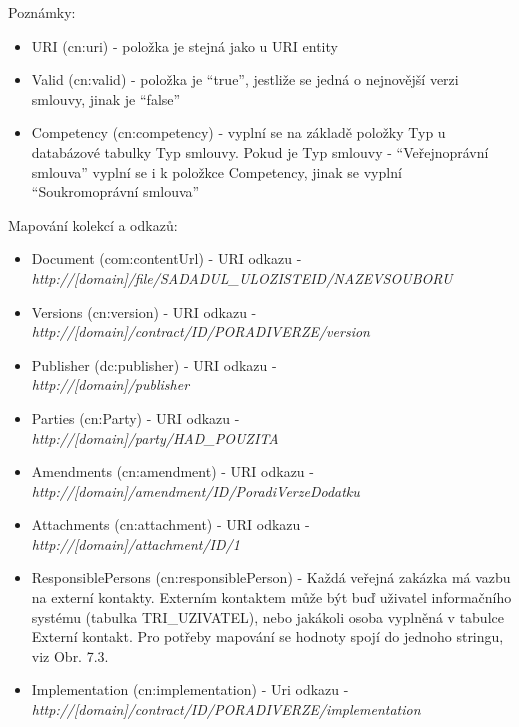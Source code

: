 Poznámky:
\begin{itemize}
\item URI (cn:uri) - položka je stejná jako u URI entity
\item Valid (cn:valid) - položka je “true”, jestliže se jedná o nejnovější verzi smlouvy, jinak je “false”
\item Competency (cn:competency) - vyplní se na základě položky Typ u databázové tabulky Typ smlouvy. Pokud je Typ smlouvy - “Veřejnoprávní smlouva” vyplní se i k položkce Competency, jinak se vyplní “Soukromoprávní smlouva”
\end{itemize}

Mapování kolekcí a odkazů:
\begin{itemize}
\item Document (com:contentUrl) - URI odkazu -\\\textit{http://[domain]/file/{SADADUL\_ULOZISTEID}/{NAZEVSOUBORU}}
\item Versions (cn:version) - URI odkazu -\\\textit{http://[domain]/contract/{ID}/{PORADIVERZE}/version}
\item Publisher (dc:publisher) - URI odkazu -\\\textit{http://[domain]/publisher}
\item Parties (cn:Party) - URI odkazu -\\\textit{http://[domain]/party/{HAD\_POUZITA}}
\item Amendments (cn:amendment) - URI odkazu -\\\textit{http://[domain]/amendment/{ID}/{PoradiVerzeDodatku}}
\item Attachments (cn:attachment) - URI odkazu -\\\textit{http://[domain]/attachment/{ID}/1}
\item ResponsiblePersons (cn:responsiblePerson) - Každá veřejná zakázka má vazbu na externí kontakty. Externím kontaktem může být buď uživatel informačního systému (tabulka TRI\_UZIVATEL), nebo jakákoli osoba vyplněná v tabulce Externí kontakt. Pro potřeby mapování se hodnoty spojí do jednoho stringu, viz Obr. 7.3.
\item Implementation (cn:implementation) - Uri odkazu -\\\textit{http://[domain]/contract/{ID}/{PORADIVERZE}/implementation}
\end{itemize}

